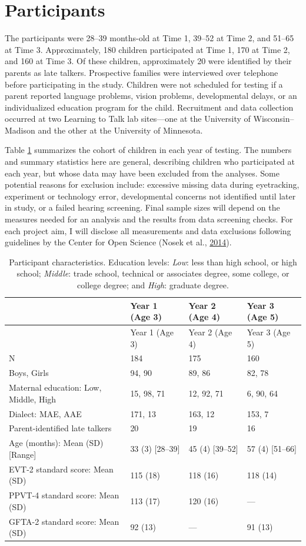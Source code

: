 \documentclass [11pt, proquest] {uwthesis}[2015/03/03]
\begin{document}
\section{Participants}\label{participants}

The participants were 28--39 months-old at Time 1, 39--52 at Time 2, and
51--65 at Time 3. Approximately, 180 children participated at Time 1,
170 at Time 2, and 160 at Time 3. Of these children, approximately 20
were identified by their parents as late talkers. Prospective families
were interviewed over telephone before participating in the study.
Children were not scheduled for testing if a parent reported language
problems, vision problems, developmental delays, or an individualized
education program for the child. Recruitment and data collection
occurred at two Learning to Talk lab sites---one at the University of
Wisconsin--Madison and the other at the University of Minnesota.

Table \ref{tab:participant-info} summarizes the cohort of children in
each year of testing. The numbers and summary statistics here are
general, describing children who participated at each year, but whose
data may have been excluded from the analyses. Some potential reasons
for exclusion include: excessive missing data during eyetracking,
experiment or technology error, developmental concerns not identified
until later in study, or a failed hearing screening. Final sample sizes
will depend on the measures needed for an analysis and the results from
data screening checks. For each project aim, I will disclose all
measurements and data exclusions following guidelines by the Center for
Open Science (Nosek et al.,
\protect\hyperlink{ref-OSF_Statement}{2014}).
\begin{longtable}[]{@{}llll@{}}
\caption{\label{tab:participant-info} Participant characteristics. Education
levels: \emph{Low}: less than high school, or high school;
\emph{Middle}: trade school, technical or associates degree, some
college, or college degree; and \emph{High}: graduate
degree.}\tabularnewline
\toprule
& Year 1 (Age 3) & Year 2 (Age 4) & Year 3 (Age 5)\tabularnewline
\midrule
\endfirsthead
\toprule
& Year 1 (Age 3) & Year 2 (Age 4) & Year 3 (Age 5)\tabularnewline
\midrule
\endhead
N & 184 & 175 & 160\tabularnewline
Boys, Girls & 94, 90 & 89, 86 & 82, 78\tabularnewline
Maternal education: Low, Middle, High & 15, 98, 71 & 12, 92, 71 & 6, 90,
64\tabularnewline
Dialect: MAE, AAE & 171, 13 & 163, 12 & 153, 7\tabularnewline
Parent-identified late talkers & 20 & 19 & 16\tabularnewline
Age (months): Mean (SD) {[}Range{]} & 33 (3) {[}28--39{]} & 45 (4)
{[}39--52{]} & 57 (4) {[}51--66{]}\tabularnewline
EVT-2 standard score: Mean (SD) & 115 (18) & 118 (16) & 118
(14)\tabularnewline
PPVT-4 standard score: Mean (SD) & 113 (17) & 120 (16) &
---\tabularnewline
GFTA-2 standard score: Mean (SD) & 92 (13) & --- & 91
(13)\tabularnewline
\bottomrule
\end{longtable}
\end{document}
